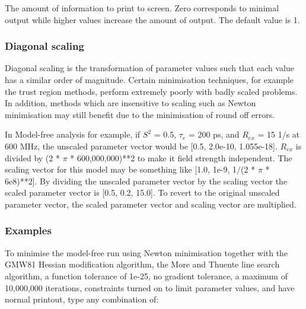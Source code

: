   

   The amount of information to print to screen.  Zero corresponds to minimal output while higher values increase the amount of output.  The default value is 1.  

  

  
 \subsubsection{Diagonal scaling} 

 Diagonal scaling is the transformation of parameter values such that each value has a similar order of magnitude.  Certain minimisation techniques, for example the trust region methods, perform extremely poorly with badly scaled problems.  In addition, methods which are insensitive to scaling such as Newton minimisation may still benefit due to the minimisation of round off errors. 
  

 In Model-free analysis for example, if $S^2$ = 0.5, $\tau_e$ = 200 ps, and $R_{ex}$ = 15 1/s at 600 MHz, the unscaled parameter vector would be [0.5, 2.0e-10, 1.055e-18].  $R_{ex}$ is divided by (2 * $\pi$ * 600,000,000)**2 to make it field strength independent.  The scaling vector for this model may be something like [1.0, 1e-9, 1/(2 * $\pi$ * 6e8)**2].  By dividing the unscaled parameter vector by the scaling vector the scaled parameter vector is [0.5, 0.2, 15.0].  To revert to the original unscaled parameter vector, the scaled parameter vector and scaling vector are multiplied. 
  

  
 \subsubsection{Examples} 

 To minimise the model-free run  using Newton minimisation together with the GMW81 Hessian modification algorithm, the More and Thuente line search algorithm, a function tolerance of 1e-25, no gradient tolerance, a maximum of 10,000,000 iterations, constraints turned on to limit parameter values, and have normal printout, type any combination of: 
  


